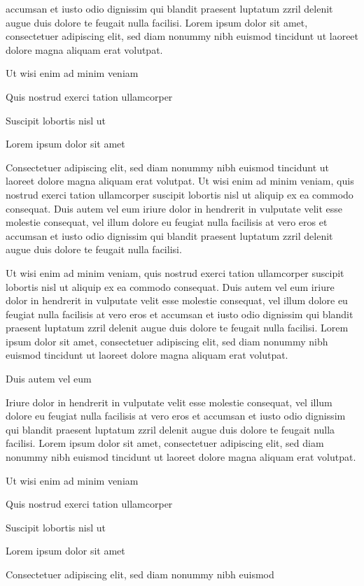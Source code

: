 \documentclass[11pt,twoside]{article}\makeatletter
\begin{document}
      accumsan et iusto odio dignissim qui blandit praesent luptatum zzril
      delenit augue duis dolore te feugait nulla facilisi. Lorem ipsum dolor
      sit amet, consectetuer adipiscing elit, sed diam nonummy nibh euismod
      tincidunt ut laoreet dolore magna aliquam erat volutpat. \par Ut wisi enim ad minim veniam\par Quis nostrud exerci tation ullamcorper \par Suscipit lobortis nisl ut \par Lorem ipsum dolor sit amet\par Consectetuer adipiscing elit, sed diam nonummy nibh euismod
      tincidunt ut laoreet dolore magna aliquam erat volutpat. Ut wisi enim
      ad minim veniam, quis nostrud exerci tation ullamcorper suscipit
      lobortis nisl ut aliquip ex ea commodo consequat. Duis autem vel eum
      iriure dolor in hendrerit in vulputate velit esse molestie consequat,
      vel illum dolore eu feugiat nulla facilisis at vero eros et accumsan
      et iusto odio dignissim qui blandit praesent luptatum zzril delenit
      augue duis dolore te feugait nulla facilisi.\par Ut wisi enim ad minim veniam, quis nostrud exerci tation
      ullamcorper suscipit lobortis nisl ut aliquip ex ea commodo
      consequat. Duis autem vel eum iriure dolor in hendrerit in vulputate
      velit esse molestie consequat, vel illum dolore eu feugiat nulla
      facilisis at vero eros et accumsan et iusto odio dignissim qui blandit
      praesent luptatum zzril delenit augue duis dolore te feugait nulla
      facilisi. Lorem ipsum dolor sit amet, consectetuer adipiscing elit,
      sed diam nonummy nibh euismod tincidunt ut laoreet dolore magna
      aliquam erat volutpat. \par Duis autem vel eum \par Iriure dolor in hendrerit in vulputate velit esse molestie
      consequat, vel illum dolore eu feugiat nulla facilisis at vero eros et
      accumsan et iusto odio dignissim qui blandit praesent luptatum zzril
      delenit augue duis dolore te feugait nulla facilisi. Lorem ipsum dolor
      sit amet, consectetuer adipiscing elit, sed diam nonummy nibh euismod
      tincidunt ut laoreet dolore magna aliquam erat volutpat. \par Ut wisi enim ad minim veniam\par Quis nostrud exerci tation ullamcorper \par Suscipit lobortis nisl ut \par Lorem ipsum dolor sit amet\par Consectetuer adipiscing elit, sed diam nonummy nibh euismod
\end{document}
